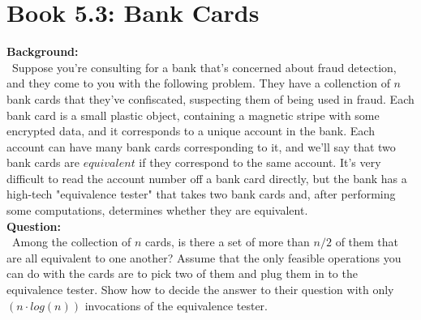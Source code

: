 \documentclass[12pt]{article}
\begin{document}

\newcommand{\hmwkClass}{COS 255}
\newcommand{\hmwkSemester}{Spring 2016}

\newcommand{\hmwkAuthorName}{Lukas Leung}
\newcommand{\hmwkAuthorID}{lleung}

\newcommand{\hmwkAssignmentNum}{4}

\newcommand{\hmwkProblemNum}{3}

\newcommand{\hmwkCollaborators}{}
\thispagestyle{fancycollab}




\section{Book 5.3: Bank Cards}
\textbf{Background:} \\
~\indent Suppose you're consulting for a bank that's concerned about
fraud detection, and they come to you with the following problem.
They have a collenction of $n$ bank cards that they've confiscated,
suspecting them of being used in fraud. Each bank card is a small
plastic object, containing a magnetic stripe with some encrypted
data, and it corresponds to a unique account in the bank. Each account
can have many bank cards corresponding to it, and we'll say that
two bank cards are $equivalent$ if they correspond to the same
account. It's very difficult to read the account number off a bank
card directly, but the bank has a high-tech "equivalence tester"
that takes two bank cards and, after performing some computations,
determines whether they are equivalent. \\
\textbf{Question:} \\
~\indent Among the collection of $n$ cards, is there a set of more
than $n/2$ of them that are all equivalent to one another? Assume
that the only feasible operations you can do with the cards are to
pick two of them and plug them in to the equivalence tester. Show
how to decide the answer to their question with only $(n\cdot log(n))$
invocations of the equivalence tester.
\end{document}
